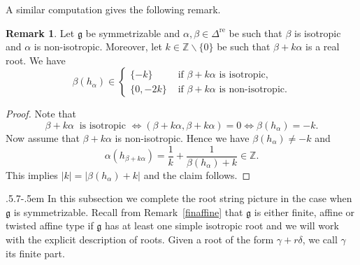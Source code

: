 \documentclass[11pt,reqno]{amsart}
\makeatletter
\theoremstyle{plain}
\theoremstyle{definition}
\newtheorem*{rem}{Remark}
\theoremstyle{remark}
\newcommand{\lie}[1]{\mathfrak{#1}}
\newcommand\bz{\mathbb Z}
\numberwithin{equation}{section}
\def\subsection{\def\@secnumfont{\bfseries}\@startsection{subsection}{2}%
  {\parindent}{.5\linespacing\@plus.7\linespacing}{-.5em}%
  {\normalfont\bfseries}}
\makeatother
\begin{document}
A similar computation gives the following remark.
\begin{rem}\label{remintiso} Let $\lie g$ be symmetrizable and  $\alpha,\beta\in\Delta^{\mathrm{re}}$ be such that $\beta$ is isotropic and $\alpha$ is non-isotropic. Moreover, let $k\in \mathbb{Z}\backslash\{0\}$ be such that $\beta+k\alpha$ is a real root. We have
    $$\beta(h_\alpha)\in\begin{cases}
    \{-k\} & \text{ if } \beta+k\alpha \text{ is isotropic},\\
   \{0,-2k\} & \text{ if } \beta+k\alpha \text{ is non-isotropic}.
\end{cases}$$
\begin{proof}
Note that 
$$\beta+k\alpha \ \text{ is isotropic } \iff (\beta+k\alpha,\beta+k\alpha)=0 \iff \beta(h_\alpha)=-k.$$ Now assume that $\beta+k\alpha$ is non-isotropic. Hence we have $\beta(h_\alpha)\neq -k$ and 
$$\alpha(h_{\beta+k\alpha})=\frac{1}{k}+\frac{1}{\beta(h_\alpha)+k}\in \bz.$$
This implies $|k|=|\beta(h_\alpha)+k|$ and the claim follows.
\end{proof} 
\end{rem}

\subsection{} In this subsection we complete the root string picture in the case when $\lie g$ is symmetrizable. Recall from Remark~\ref{finaffine} that $\lie g$ is either finite, affine or twisted affine type if $\lie g$ has at least one simple isotropic root and we will work with the explicit description of roots. Given a root of the form $\gamma+r\delta$, we call $\gamma$ its finite part.
\end{document}
